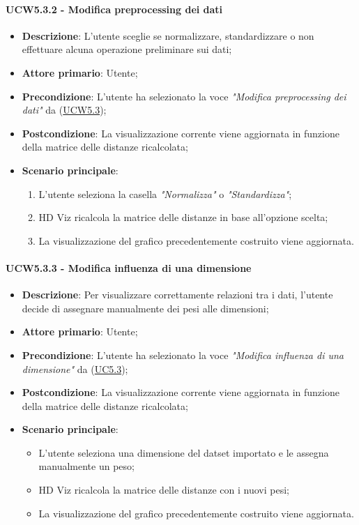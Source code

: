 \paragraph{UCW5.3.2 - Modifica preprocessing dei dati}
\label{par:ucw5.3.2}
\begin{itemize}
    \item \textbf{Descrizione}: L’utente sceglie se normalizzare, standardizzare o non effettuare alcuna operazione preliminare sui dati;

    \item \textbf{Attore primario}: Utente;
    \item \textbf{Precondizione}: L'utente ha selezionato la voce \emph{"Modifica preprocessing dei dati"} da (\hyperref[ssub:ucw5.3]{UCW5.3});
    \item \textbf{Postcondizione}: La visualizzazione corrente viene aggiornata in funzione della matrice delle distanze ricalcolata;
    \item \textbf{Scenario principale}:
    \begin{enumerate}
        \item L'utente seleziona la casella \emph{"Normalizza"} o \emph{"Standardizza"};
        \item HD Viz ricalcola la matrice delle distanze in base all'opzione scelta;
        \item La visualizzazione del grafico precedentemente costruito viene aggiornata.
    \end{enumerate}
\end{itemize}

\paragraph{UCW5.3.3 - Modifica influenza di una dimensione}
\label{par:ucw5.3.3}
\begin{itemize}
    \item \textbf{Descrizione}: Per visualizzare correttamente relazioni tra i dati,
                                l’utente decide di assegnare manualmente dei pesi alle dimensioni;

    \item \textbf{Attore primario}: Utente;
    \item \textbf{Precondizione}: L'utente ha selezionato la voce \emph{"Modifica influenza di una dimensione"} da (\hyperref[ssub:uc5.3]{UC5.3});

    \item \textbf{Postcondizione}: La visualizzazione corrente viene aggiornata in funzione della matrice delle distanze ricalcolata;
    \item \textbf{Scenario principale}:
    \begin{itemize}
        \item L’utente seleziona una dimensione del datset importato e le assegna manualmente un peso;
        \item HD Viz ricalcola la matrice delle distanze con i nuovi pesi;
        \item La visualizzazione del grafico precedentemente costruito viene aggiornata.
    \end{itemize}
\end{itemize}

